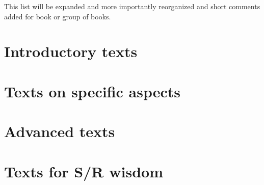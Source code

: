 \documentclass[krantz2]{krantz}\usepackage{knitr}%
\begin{document}
\begin{warningbox}
  This list will be expanded and more importantly reorganized and short comments added for book or group of books.
\end{warningbox}

\section{Introductory texts}

\cite{Allerhand2011,Dalgaard2008,Zuur2009,Teetor2011,Peng2017,Paradis2005,Peng2016}

\section{Texts on specific aspects}

\cite{Chang2013,Fox2002,Fox2010,Faraway2004,Faraway2006,Everitt2011,Wickham2017}

\section{Advanced texts}

\cite{Xie2013,Chambers2016,Wickham2015,Wickham2014advanced,Wickham2016,Pinheiro2000,Murrell2011,Matloff2011,Ihaka1996,Venables2000}

\section{Texts for S/R wisdom}

\cite{Burns1998,Burns2011,Burns2012,Bentley1986,Bentley1988}

\backmatter

\printbibliography

\printindex

\printindex[rcatsidx]

\printindex[rindex]
\end{document}

